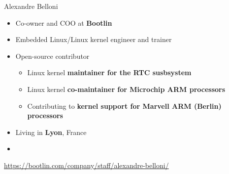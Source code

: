 \begin{frame}{Alexandre Belloni}
    \begin{itemize}
      \item Co-owner and COO at {\bf Bootlin}
      \item Embedded Linux/Linux kernel engineer and trainer
      \item Open-source contributor
        \begin{itemize}
          \item Linux kernel {\bf maintainer for the RTC susbsystem}
          \item Linux kernel {\bf co-maintainer for Microchip ARM
            processors}
          \item Contributing to {\bf kernel support for Marvell
            ARM (Berlin) processors}
        \end{itemize}
      \item Living in {\bf Lyon}, France
      \item {}
    \end{itemize}
    {\small \url{https://bootlin.com/company/staff/alexandre-belloni/}}
\end{frame}

